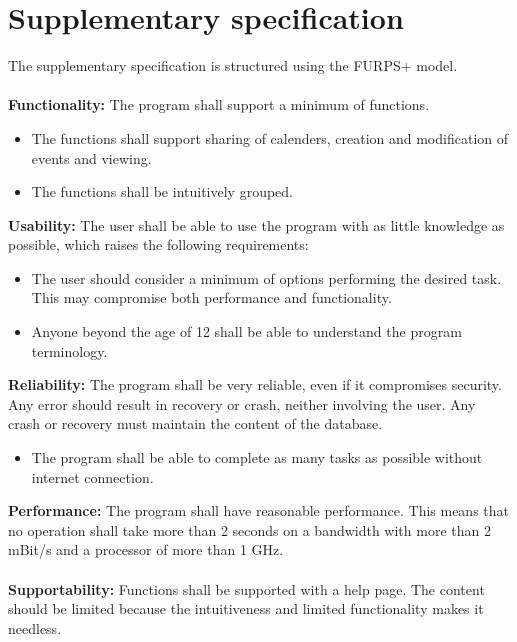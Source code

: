 \documentclass[a4paper,10pt,titlepage]{article}
\begin{document}
\section{Supplementary specification}
	The supplementary specification is structured using the FURPS+ model.
	\\ \\
	\textbf{Functionality:}
	The program shall support a minimum of functions.
	\begin{itemize}
	\item The functions shall support sharing of calenders, creation and modification of events and viewing.
	\item The functions shall be intuitively grouped.
	\\
	\end{itemize}
	\textbf{Usability:}
	The user shall be able to use the program with as little knowledge as possible, which raises the following requirements:
	\begin{itemize}
	\item The user should consider a minimum of options performing the desired task. This may compromise both performance and functionality.
	\item Anyone beyond the age of 12 shall be able to understand the program terminology. 
	\\
	\end{itemize}
	\textbf{Reliability:}
	The program shall be very reliable, even if it compromises security. Any error should result in recovery or crash, neither involving the user. Any crash or recovery must maintain the content of the database.
	\begin{itemize}
	\item The program shall be able to complete as many tasks as possible without internet connection.
	\\
	\end{itemize}
	\textbf{Performance:}
	The program shall have reasonable performance. This means that no operation shall take more than 2 seconds on a bandwidth with more than 2 mBit/s and a processor of more than 1 GHz.
	\\ \\
	\textbf{Supportability:}
	Functions shall be supported with a help page. The content should be limited because the intuitiveness and limited functionality makes it needless.
	\\ \\
\end{document}
